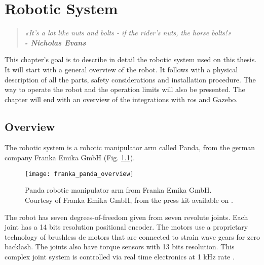 \chapter{Robotic System}
\label{cha:robotic_system}

\begin{quotation}
\begin{flushright}
\itshape
«It's a lot like nuts and bolts - if the rider's nuts, the horse bolts!»\\
\textbf{- Nicholas Evans}
\end{flushright}
\end{quotation}

This chapter's goal is to describe in detail the robotic system used on this thesis. It will start with a general overview of the robot. It follows with a physical description of all the parts, safety considerations and installation procedure. The way to operate the robot and the operation limits will also be presented. The chapter will end with an overview of the integrations with \gls{ros} and Gazebo.


\section{Overview}
\label{sec:robotic_system_overview}

The robotic system is a robotic manipulator arm called Panda, from the german company Franka Emika GmbH (Fig. \ref{fig:franka_panda_overview}). 

\begin{figure}[htbp]
	\centering
	\texttt{[image: franka\_panda\_overview]}
	\caption[Panda robotic manipulator arm.]{Panda robotic manipulator arm from Franka Emika GmbH. Courtesy of Franka Emika GmbH, from the press kit available on \cite{FrankaEmikaGmbH_official_website}.}
	\label{fig:franka_panda_overview}
\end{figure}

The robot has seven degrees-of-freedom given from seven revolute joints. Each joint has a 14 bits resolution positional encoder. The motors use a proprietary technology of brushless dc motors that are connected to strain wave gears for zero backlash. The joints also have torque sensors with 13 bits resolution. This complex joint system is controlled via real time electronics at 1 kHz rate \cite{FrankaEmikaGmbH_technology}.

